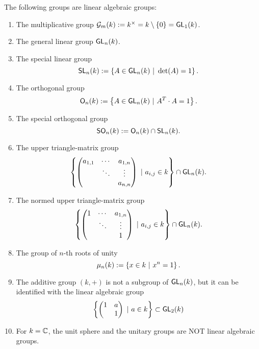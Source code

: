 \begin{example}
	The following groups are linear algebraic groups:
	\begin{enumerate}
		\item The multiplicative group $\mathcal{G}_m(k) := k^\times = k \setminus \{0\} = \textsf{GL}_1(k)$.
		\item The general linear group $\textsf{GL}_n(k)$.
		\item The special linear group
		\[\textsf{SL}_n(k) := \left\lbrace A \in \textsf{GL}_n(k) ~ | ~ \det(A) = 1\right\rbrace. \]
		\item The orthogonal group
		\[\mathsf{O}_n(k) := \left\lbrace A \in \textsf{GL}_n(k) ~ | ~ A^T\cdot A = 1\right\rbrace. \]
			\item The special orthogonal group
		\[\textsf{SO}_n(k) := \mathsf{O}_n(k) \cap \textsf{SL}_n(k). \]
		\item The upper triangle-matrix group
		\[ \left\lbrace 
	\left(\begin{matrix}  a_{1,1} & \cdots & a_{1,n}\\
		& \ddots & \vdots\\
		& & a_{n,n} \end{matrix}\right)	
	  ~ | ~ a_{i,j} \in k\right\rbrace \cap \textsf{GL}_n(k).  \]
 \item The normed upper triangle-matrix group
 \[ \left\lbrace 
 	\left(\begin{matrix}  1 & \cdots & a_{1,n}\\
 		& \ddots & \vdots\\
 		& & 1 \end{matrix}\right)	
  ~ | ~ a_{i,j} \in k\right\rbrace \cap \textsf{GL}_n(k).  \]
	\item The group of $n$-th roots of unity
	\[ \mu_n(k) := \left\lbrace x \in k ~ | ~ x^n = 1\right\rbrace. \]
	\item The additive group $(k, +)$ is not a subgroup of $\textsf{GL}_n(k)$, but it can be identified with the linear algebraic group
	\[ \left\lbrace\left(\begin{matrix} 1 & a \\ & 1 \end{matrix}\right) ~ | ~ a \in k\right\rbrace \subset \textsf{GL}_2(k) \]
	\item For $k = \mathbb{C}$, the unit sphere and the unitary groups are NOT linear algebraic groups.
	\end{enumerate}
\end{example}